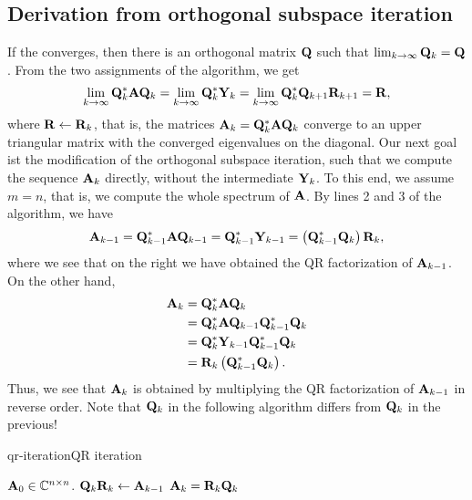 \subsection{Derivation from orthogonal subspace iteration}
\begin{remark}
  \label{par:qr:intro}
  If the  converges, then
  there is an orthogonal matrix $\mathbf Q$ such that
  $\lim_{k \to \infty} \mathbf Q_k = \mathbf Q$.  From the two assignments of
  the algorithm, we get
  \begin{gather}
    \lim_{k \to \infty} \mathbf Q_k^* \mathbf A \mathbf Q_k = \lim_{k \to \infty} \mathbf Q_k^* \mathbf Y_k = \lim_{k \to \infty}
    \mathbf Q_k^*\mathbf Q_{k+1}\mathbf R_{k+1} = \mathbf R,
  \end{gather}
  where $\mathbf R\leftarrow\mathbf R_k$, that is, the matrices
  $\mathbf A_k = \mathbf Q_k^*\mathbf A\mathbf Q_k$ converge to an upper triangular
  matrix with the converged eigenvalues on the diagonal. Our next goal
  ist the modification of the orthogonal subspace iteration, such that
  we compute the sequence $\mathbf A_k$ directly, without the intermediate
  $\mathbf Y_k$. To this end, we assume $m=n$, that is, we compute the
  whole spectrum of $\mathbf A$. By lines 2 and 3 of the algorithm, we have
  \begin{gather*}
    \mathbf A_{k-1} = \mathbf Q_{k-1}^*\mathbf A\mathbf Q_{k-1} = \mathbf Q_{k-1}^* \mathbf Y_{k-1} = \left(\mathbf Q_{k-1}^*\mathbf Q_{k}\right)\mathbf R_k,
  \end{gather*}
  where we see that on the right we have obtained the QR factorization of $\mathbf A_{k-1}$.
  On the other hand,
  \begin{align*}
    \mathbf A_k
    &= \mathbf Q_k^*\mathbf A\mathbf Q_k\\
    &= \mathbf Q_k^*\mathbf A\mathbf Q_{k-1}\mathbf Q_{k-1}^*\mathbf Q_k\\
    &= \mathbf Q_k^*\mathbf Y_{k-1} \mathbf Q_{k-1}^*\mathbf Q_k\\
    &= \mathbf R_k \left(\mathbf Q_{k-1}^*\mathbf Q_k\right).
  \end{align*}
  Thus, we see that $\mathbf A_k$ is obtained by multiplying the QR
  factorization of $\mathbf A_{k-1}$ in reverse order. Note that $\mathbf Q_k$
  in the following algorithm differs from $\mathbf Q_k$ in the previous!
\end{remark}

\begin{Algorithm*}{qr-iteration}{QR iteration}
  \begin{algorithmic}[1]
    \Require $\mathbf A_0\in\mathbb C^{n\times n}$.
    \State $\mathbf Q_k\mathbf R_k \gets \mathbf A_{k-1}$ 
    \State $\mathbf A_{k} = \mathbf R_k\mathbf Q_k$
    \EndFor
  \end{algorithmic}
\end{Algorithm*}

